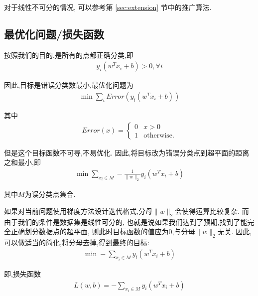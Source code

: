 \documentclass[a4paper,12pt]{article}
\begin{document}
			对于线性不可分的情况,
			可以参考第 \ref{sec:extension} 节中的推广算法.
            

        \subsection{最优化问题/损失函数}

            按照我们的目的,是所有的点都正确分类,即
            \begin{eqnarray}
                y_i (w^T x_i +b) > 0 ,\forall i
			\end{eqnarray}
			
            因此,目标是错误分类数最小,最优化问题为
            \begin{eqnarray}
                \min \sum_i Error\left(y_i (w^T x_i +b)\right)
			\end{eqnarray}
			
            其中
            \begin{eqnarray}
                Error(x) =  
                \begin{cases}
                    0 & x>0\\
                    1 & \text{otherwise}.
                \end{cases}
			\end{eqnarray}
			
            但是这个目标函数不可导,不易优化.
            因此,将目标改为错误分类点到超平面的距离之和最小,即
            \begin{eqnarray}
                \min \sum_{x_i \in M} -\frac{1}{\| w \|_2} y_i ( w^T x_i + b)
			\end{eqnarray}
			
            其中$M$为误分类点集合.

            如果对当前问题使用梯度方法设计迭代格式,分母$\|w\|_2$会使得运算比较复杂.
            而由于我们的条件是数据集是线性可分的,
            也就是说如果我们达到了预期,找到了能完全正确划分数据点的超平面,
            则此时目标函数的值应为0,与分母$\|w\|_2$无关.
            因此,可以做适当的简化,将分母去掉,得到最终的目标:
            \begin{eqnarray}
                \min -\sum_{x_i \in M} y_i ( w^T x_i + b)
            \end{eqnarray}
			
			即,损失函数
            \begin{eqnarray}
                L(w,b) = -\sum_{x_i \in M} y_i ( w^T x_i + b)
			\end{eqnarray}
			
\end{document}
